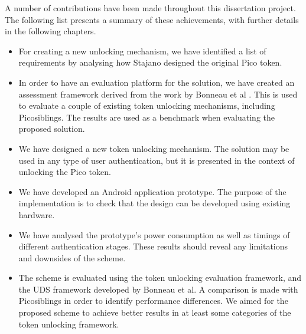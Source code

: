 A number of contributions have been made throughout this dissertation project. The following list presents a summary of these achievements, with further details in the following chapters.
\begin{itemize}
	\item For creating a new unlocking mechanism, we have identified a list of requirements by analysing how Stajano \cite{stajano2011pico} designed the original Pico token.

	\item In order to have an evaluation platform for the solution, we have created an assessment framework derived from the work by Bonneau et al \cite{bonneau2012quest}. This is used to evaluate a couple of existing token unlocking mechanisms, including Picosiblings. The results are used as a benchmark when evaluating the proposed solution.
	
	\item We have designed a new token unlocking mechanism. The solution may be used in any type of user authentication, but it is presented in the context of unlocking the Pico token. 
	
	\item We have developed an Android application prototype. The purpose of the implementation is to check that the design can be developed using existing hardware. 
	
	\item We have analysed the prototype's power consumption as well as timings of different authentication stages. These results should reveal any limitations and downsides of the scheme.
	
	\item The scheme is evaluated using the token unlocking evaluation framework, and the UDS framework developed by Bonneau et al. A comparison is made with Picosiblings in order to identify performance differences. We aimed for the proposed scheme to achieve better results in at least some categories of the token unlocking framework.
	
\end{itemize}	
